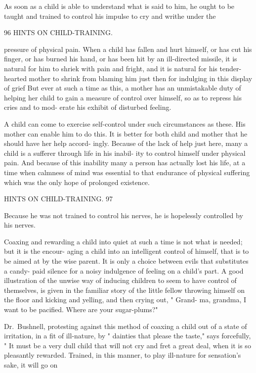 \documentclass[
]{book}
\begin{document}
As soon as a child is able to understand what is said to him, he ought to be taught and trained to control his impulse to cry and writhe under the

96 HINTS ON CHILD-TRAINING.

pressure of physical pain. When a child has fallen and hurt himself, or has cut his finger, or has burned his hand, or has been hit by an ill-directed missile, it is natural for him to shriek with pain and fright, and it is natural for his tender-hearted mother to shrink from blaming him just then for indulging in this display of grief But ever at such a time as this, a mother has an unmistakable duty of helping her child to gain a measure of control over himself, so as to repress his cries and to mod- erate his exhibit of disturbed feeling.

A child can come to exercise self-control under such circumstances as these. His mother can enable him to do this. It is better for both child and mother that he should have her help accord- ingly. Because of the lack of help just here, many a child is a sufferer through life in his inabil- ity to control himself under physical pain. And because of this inability many a person has actually lost his life, at a time when calmness of mind was essential to that endurance of physical suffering which was the only hope of prolonged existence.

HINTS ON CHILD-TRAINING. 97

Because he was not trained to control his nerves, he is hopelessly controlled by his nerves.

Coaxing and rewarding a child into quiet at such a time is not what is needed; but it is the encour- aging a child into an intelligent control of himself, that is to be aimed at by the wise parent. It is only a choice between evils that substitutes a candy- paid silence for a noisy indulgence of feeling on a child's part. A good illustration of the unwise way of inducing children to seem to have control of themselves, is given in the familiar story of the little fellow throwing himself on the floor and kicking and yelling, and then crying out, " Grand- ma, grandma, I want to be pacified. Where are your sugar-plums?"

Dr.~Bushnell, protesting against this method of coaxing a child out of a state of irritation, in a fit of ill-nature, by " dainties that please the taste," says forcefully, " It must be a very dull child that will not cry and fret a great deal, when it is so pleasantly rewarded. Trained, in this manner, to play ill-nature for sensation's sake, it will go on
\end{document}
